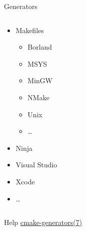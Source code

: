 \documentclass[t]{beamer}
\begin{document}
\begin{frame}{Generators}
    \begin{columns}[T]
        \begin{column}{0.4\textwidth}
            \begin{itemize}
                \item Makefiles
                    \begin{itemize}
                        \item Borland
                        \item MSYS
                        \item MinGW
                        \item NMake
                        \item Unix
                        \item …
                    \end{itemize}
                \item Ninja
                \item Visual Studio
                \item Xcode
                \item …
            \end{itemize}
        \end{column}
        \begin{column}{0.6\textwidth}
        \end{column}
    \end{columns}

    \begin{block}{Help}
        \href{https://cmake.org/cmake/help/latest/manual/cmake-generators.7.html}{cmake-generators(7)}
    \end{block}
\end{frame}
\end{document}

